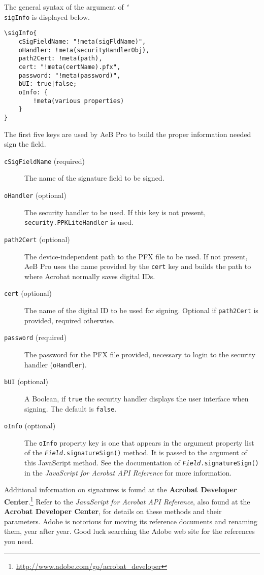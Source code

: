 \documentclass[12pt]{article}
\newcommand{\cs}[1]{\texttt{\char`\\#1}}
\begin{document}
The general syntax of the argument of \cs{sigInfo} is displayed below.
\def\meta#1{$\langle\textsl{\texttt{#1}}\rangle$}
\begin{Verbatim}[xleftmargin=20pt,fontsize=\footnotesize,commandchars={!()}]
\sigInfo{
    cSigFieldName: "!meta(sigFldName)",
    oHandler: !meta(securityHandlerObj),
    path2Cert: !meta(path),
    cert: "!meta(certName).pfx",
    password: "!meta(password)",
    bUI: true|false;
    oInfo: {
        !meta(various properties)
    }
}
\end{Verbatim}
The first five keys are used by AeB Pro to build the proper information
needed sign the field.
\begin{description}
  \item[\normalfont\texttt{cSigFieldName} (required)] The
      name of the signature field to be signed.
  \item[\normalfont\texttt{oHandler} (optional)] The security
      handler to be used. If this key is  not present,
      \texttt{security.PPKLiteHandler} is used.
  \item[\normalfont\texttt{path2Cert} (optional)] The
      device-independent path to the PFX file to be used. If not
      present, AeB Pro uses the name provided by the \texttt{cert} key
      and builds the path to where Acrobat normally saves digital IDs.
  \item[\normalfont\texttt{cert} (optional)] The name of the digital
      ID to be used for signing. Optional if \texttt{path2Cert} is
      provided, required otherwise.
  \item[\normalfont\texttt{password} (required)] The password for the PFX file
      provided, necessary to login to the security handler (\texttt{oHandler}).
  \item [\normalfont\texttt{bUI} (optional)] A Boolean, if
      \texttt{true} the security handler displays the user interface
      when signing. The default is \texttt{false}.
  \item[\normalfont\texttt{oInfo} (optional)] The \texttt{oInfo} property key is
      one that appears in the argument property list of the
      \texttt{\textsl{Field}.signatureSign()} method. It is passed to
      the argument of this JavaScript method. See the documentation of
      \texttt{\textsl{Field}.signatureSign()} in the
      \emph{JavaScript for Acrobat API Reference} for more information.
\end{description}

Additional information on signatures is found at the
\textbf{Acrobat Developer Center}.\footnote{\url{http://www.adobe.com/go/acrobat_developer}}
Refer to the \emph{JavaScript for Acrobat API Reference}, also found at the \textbf{Acrobat Developer Center},
for details on these methods and their parameters. Adobe is
notorious for moving its reference documents and renaming them, year after
year. Good luck searching the Adobe web site for the references you need.
\end{document}
